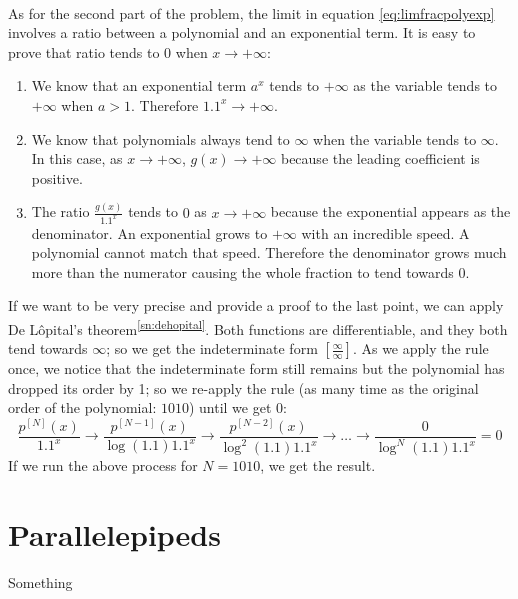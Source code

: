 \paragraph{}
As for the second part of the problem, the limit in equation \ref{eq:limfracpolyexp} involves
a ratio between a polynomial and an exponential term. It is easy to prove that ratio tends
to $0$ when $x \to +\infty$:
\begin{enumerate}
    \item We know that an exponential term $a^x$ tends to $+\infty$ as the variable tends
        to $+\infty$ when $a > 1$. Therefore $1.1^x \to +\infty$.
    \item We know that polynomials always tend to $\infty$ when the variable tends to $\infty$.
        In this case, as $x \to +\infty$, $g(x) \to +\infty$ because the leading coefficient
        is positive.
    \item The ratio $\frac{g(x)}{1.1^x}$ tends to $0$ as $x \to +\infty$ because the exponential
        appears as the denominator. An exponential grows to $+\infty$ with an incredible speed.
        A polynomial cannot match that speed. Therefore the denominator grows much more than
        the numerator causing the whole fraction to tend towards $0$.
\end{enumerate}
If we want to be very precise and provide a proof to the last point, we can apply De L\^{o}pital's
theorem\textsuperscript{\ref{sn:dehopital}}. Both functions are
differentiable,
and they both tend towards $\infty$; so we get the indeterminate
form $\left[ \frac{\infty}{\infty} \right]$. As we apply the rule once, we notice that the
indeterminate form still remains but the polynomial has dropped its order by 1; so we re-apply
the rule (as many time as the original order of the polynomial: $1010$) until we get $0$:
\begin{equation*}
    \frac{p^{[N]}(x)}{1.1^x} \rightarrow \frac{p^{[N-1]}(x)}{\log(1.1)1.1^x}
        \rightarrow \frac{p^{[N-2]}(x)}{\log^2(1.1)1.1^x} \rightarrow \dots \rightarrow
        \frac{0}{\log^N(1.1)1.1^x} = 0
\end{equation*}
If we run the above process for $N=1010$, we get the result.

\section{Parallelepipeds}
\label{sec:paralpyd}
Something


